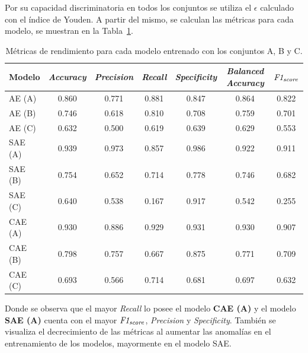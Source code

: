 \documentclass[a4paper,10pt]{book}
\begin{document}
Por su capacidad discriminatoria en todos los conjuntos se utiliza el $\epsilon$ calculado con el índice de Youden. A partir del mismo, se calculan las métricas para cada modelo, se muestran en la Tabla~\ref{tab:metricas_modelos}.
\begin{table}[H]
	\centering
	\caption{Métricas de rendimiento para cada modelo entrenado con los conjuntos A, B y C.}
	\begin{tabular}{lcccccc}
		\toprule
		\textbf{Modelo} &
		\textbf{\emph{Accuracy}} &
		\textbf{\emph{Precision}} &
		\textbf{\emph{Recall}} &
		\textbf{\emph{Specificity}} &
		\textbf{\emph{Balanced Accuracy}} &
		\textbf{$\emph{F1}_{\emph{score}}$} \\
		\midrule
		AE (A)  & 0.860 & 0.771 & 0.881 & 0.847 & 0.864 & 0.822 \\
		AE (B)  & 0.746 & 0.618 & 0.810 & 0.708 & 0.759 & 0.701 \\
		AE (C)  & 0.632 & 0.500 & 0.619 & 0.639 & 0.629 & 0.553 \\
		\midrule
		SAE (A) & 0.939 & 0.973 & 0.857 & 0.986 & 0.922 & 0.911 \\
		SAE (B) & 0.754 & 0.652 & 0.714 & 0.778 & 0.746 & 0.682 \\
		SAE (C) & 0.640 & 0.538 & 0.167 & 0.917 & 0.542 & 0.255 \\
		\midrule
		CAE (A) & 0.930 & 0.886 & 0.929 & 0.931 & 0.930 & 0.907 \\
		CAE (B) & 0.798 & 0.757 & 0.667 & 0.875 & 0.771 & 0.709 \\
		CAE (C) & 0.693 & 0.566 & 0.714 & 0.681 & 0.697 & 0.632 \\
		\bottomrule
	\end{tabular}
	\label{tab:metricas_modelos}
\end{table}
\noindent
Donde se observa que el mayor \emph{Recall} lo posee el modelo \textbf{CAE (A)} y el modelo \textbf{SAE (A)} cuenta con el mayor $\emph{F1}_{\emph{score}}$, \emph{Precision} y \emph{Specificity}. También se visualiza el decrecimiento de las métricas al aumentar las anomalías en el entrenamiento de los modelos, mayormente en el modelo SAE.\\
\end{document}
